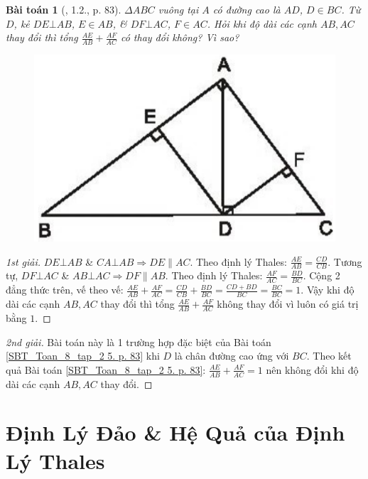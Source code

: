 \documentclass{article}
\newtheorem{baitoan}{Bài toán}
\begin{document}
\begin{baitoan}[\cite{SBT_Toan_8_tap_2}, 1.2., p. 83]
	$\Delta ABC$ vuông tại $A$ có đường cao là $AD$, $D\in BC$. Từ $D$, kẻ $DE\bot AB$, $E\in AB$, \& $DF\bot AC$, $F\in AC$. Hỏi khi độ dài các cạnh $AB,AC$ thay đổi thì tổng $\frac{AE}{AB} + \frac{AF}{AC}$ có thay đổi không? Vì sao?
	\begin{figure}[H]
		\centering
		\includegraphics[scale=0.2]{SBT_Toan_8_bs7}
	\end{figure}
\end{baitoan}

\begin{proof}[1st giải]	
	$DE\bot AB$ \& $CA\bot AB\Rightarrow DE\parallel AC$. Theo định lý Thales: $\frac{AE}{AB} = \frac{CD}{CB}$. Tương tự, $DF\bot AC$ \& $AB\bot AC\Rightarrow DF\parallel AB$. Theo định lý Thales: $\frac{AF}{AC} = \frac{BD}{BC}$. Cộng 2 đẳng thức trên, vế theo vế: $\frac{AE}{AB} + \frac{AF}{AC} = \frac{CD}{CB} + \frac{BD}{BC} = \frac{CD + BD}{BC} = \frac{BC}{BC} = 1$. Vậy khi độ dài các cạnh $AB,AC$ thay đổi thì tổng $\frac{AE}{AB} + \frac{AF}{AC}$ không thay đổi vì luôn có giá trị bằng $1$.
\end{proof}

\begin{proof}[2nd giải]
	Bài toán này là 1 trường hợp đặc biệt của Bài toán \ref{SBT_Toan_8_tap_2 5. p. 83} khi $D$ là chân đường cao ứng với $BC$. Theo kết quả Bài toán \ref{SBT_Toan_8_tap_2 5. p. 83}: $\frac{AE}{AB} + \frac{AF}{AC} = 1$ nên không đổi khi độ dài các cạnh $AB,AC$ thay đổi.
\end{proof}


\section{Định Lý Đảo \& Hệ Quả của Định Lý Thales}
\end{document}
